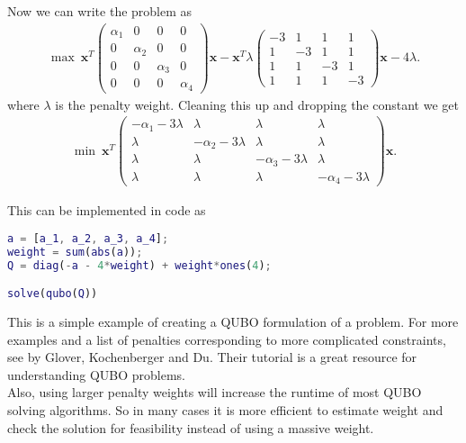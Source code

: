 \documentclass{article}
\begin{document}
\noindent Now we can write the problem as
\begin{align*}
	\max \: \mathbf{x}^T\begin{pmatrix}
		\alpha_1 & 0 & 0 & 0 \\
		0 & \alpha_2 & 0 & 0 \\
		0 & 0 & \alpha_3 & 0 \\ 
		0 & 0 & 0 & \alpha_4
	\end{pmatrix}\mathbf{x} - \mathbf{x}^T \lambda\begin{pmatrix}
	-3 & 1 & 1 & 1 \\
	1 & -3 & 1 & 1 \\
	1 & 1 & -3 & 1 \\
	1 & 1 & 1 & -3
	\end{pmatrix} \mathbf{x} - 4\lambda.
\end{align*}
where \(\lambda\) is the penalty weight. Cleaning this up and dropping the constant we get
\begin{align*}
	\min \: \mathbf{x}^T \begin{pmatrix}
		-\alpha_1 - 3\lambda & \lambda & \lambda & \lambda \\
		\lambda & -\alpha_2 - 3\lambda & \lambda & \lambda \\
		\lambda & \lambda & -\alpha_3 - 3\lambda & \lambda \\
		\lambda & \lambda & \lambda & -\alpha_4 - 3\lambda
	\end{pmatrix} \mathbf{x}.
\end{align*}

\newpage 

\noindent This can be implemented in code as
\begin{mdframed}[backgroundcolor=gray!12]
\begin{lstlisting}[language=MATLAB]
a = [a_1, a_2, a_3, a_4];
weight = sum(abs(a));
Q = diag(-a - 4*weight) + weight*ones(4);

solve(qubo(Q))
\end{lstlisting}
\end{mdframed}
\noindent This is a simple example of creating a QUBO formulation of a problem. For more examples and a list of penalties corresponding to more complicated constraints, see \cite[p.~10]{tutorialQUBO} by Glover, Kochenberger and Du. Their tutorial is a great resource for understanding QUBO problems.\\

\noindent Also, using larger penalty weights will increase the runtime of most QUBO solving algorithms. So in many cases it is more efficient to estimate weight and check the solution for feasibility instead of using a massive weight.     
\end{document}
